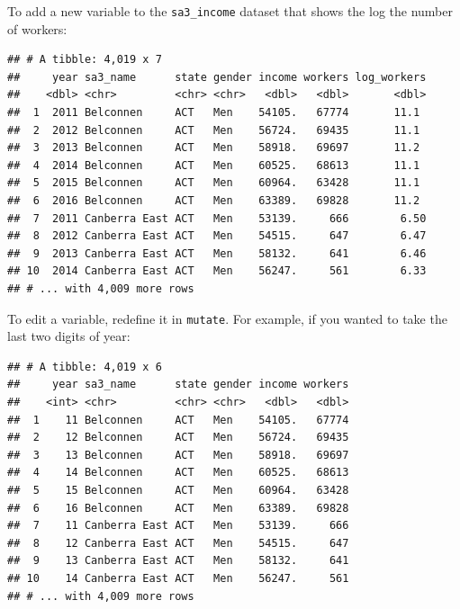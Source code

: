 \documentclass[]{book}
\newenvironment{Shaded}{\begin{snugshade}}{\end{snugshade}}
\newcommand{\DataTypeTok}[1]{\textcolor[rgb]{0.13,0.29,0.53}{#1}}
\newcommand{\DecValTok}[1]{\textcolor[rgb]{0.00,0.00,0.81}{#1}}
\newcommand{\KeywordTok}[1]{\textcolor[rgb]{0.13,0.29,0.53}{\textbf{#1}}}
\newcommand{\NormalTok}[1]{#1}
\newcommand{\OperatorTok}[1]{\textcolor[rgb]{0.81,0.36,0.00}{\textbf{#1}}}
\newcommand{\StringTok}[1]{\textcolor[rgb]{0.31,0.60,0.02}{#1}}
\begin{document}
To add a new variable to the \texttt{sa3\_income} dataset that shows the log the number of workers:

\begin{Shaded}
\end{Shaded}

\begin{verbatim}
## # A tibble: 4,019 x 7
##     year sa3_name      state gender income workers log_workers
##    <dbl> <chr>         <chr> <chr>   <dbl>   <dbl>       <dbl>
##  1  2011 Belconnen     ACT   Men    54105.   67774       11.1 
##  2  2012 Belconnen     ACT   Men    56724.   69435       11.1 
##  3  2013 Belconnen     ACT   Men    58918.   69697       11.2 
##  4  2014 Belconnen     ACT   Men    60525.   68613       11.1 
##  5  2015 Belconnen     ACT   Men    60964.   63428       11.1 
##  6  2016 Belconnen     ACT   Men    63389.   69828       11.2 
##  7  2011 Canberra East ACT   Men    53139.     666        6.50
##  8  2012 Canberra East ACT   Men    54515.     647        6.47
##  9  2013 Canberra East ACT   Men    58132.     641        6.46
## 10  2014 Canberra East ACT   Men    56247.     561        6.33
## # ... with 4,009 more rows
\end{verbatim}

To edit a variable, redefine it in \texttt{mutate}. For example, if you wanted to take the last two digits of year:

\begin{Shaded}
\end{Shaded}

\begin{verbatim}
## # A tibble: 4,019 x 6
##     year sa3_name      state gender income workers
##    <int> <chr>         <chr> <chr>   <dbl>   <dbl>
##  1    11 Belconnen     ACT   Men    54105.   67774
##  2    12 Belconnen     ACT   Men    56724.   69435
##  3    13 Belconnen     ACT   Men    58918.   69697
##  4    14 Belconnen     ACT   Men    60525.   68613
##  5    15 Belconnen     ACT   Men    60964.   63428
##  6    16 Belconnen     ACT   Men    63389.   69828
##  7    11 Canberra East ACT   Men    53139.     666
##  8    12 Canberra East ACT   Men    54515.     647
##  9    13 Canberra East ACT   Men    58132.     641
## 10    14 Canberra East ACT   Men    56247.     561
## # ... with 4,009 more rows
\end{verbatim}
\end{document}
